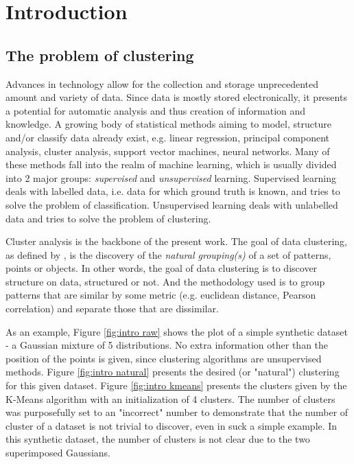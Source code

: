 \chapter{Introduction}
\label{chapter:introduction}


\section{The problem of clustering}
\label{sec:clustering}

Advances in technology allow for the collection and storage unprecedented amount and variety of data. Since data is mostly stored electronically, it presents a potential for automatic analysis and thus creation of information and knowledge. A growing body of statistical methods aiming to model, structure and/or classify data already exist, e.g. linear regression, principal component analysis, cluster analysis, support vector machines, neural networks. Many of these methods fall into the realm of machine learning, which is usually divided into 2 major groups: \textit{supervised} and \textit{unsupervised} learning.
Supervised learning deals with labelled data, i.e. data for which ground truth is known, and tries to solve the problem of classification. Unsupervised learning deals with unlabelled data and tries to solve the problem of clustering.

Cluster analysis is the backbone of the present work.
The goal of data clustering, as defined by \citep{Jain2010}, is the discovery of the \textit{natural grouping(s)} of a set of patterns, points or objects. In other words, the goal of data clustering is to discover structure on data, structured or not.
And the methodology used is to group patterns that are similar by some metric (e.g. euclidean distance, Pearson correlation) and separate those that are dissimilar. %

As an example, Figure \ref{fig:intro raw} shows the plot of a simple synthetic dataset - a Gaussian mixture of 5 distributions.
No extra information other than the position of the points is given, since clustering algorithms are unsupervised methods.
Figure \ref{fig:intro natural} presents the desired (or "natural") clustering for this given dataset.
Figure \ref{fig:intro kmeans} presents the clusters given by the K-Means algorithm with an initialization of 4 clusters.
The number of clusters was purposefully set to an "incorrect" number to demonstrate that the number of cluster of a dataset is not trivial to discover, even in suck a simple example. In this synthetic dataset, the number of clusters is not clear due to the two superimposed Gaussians.

